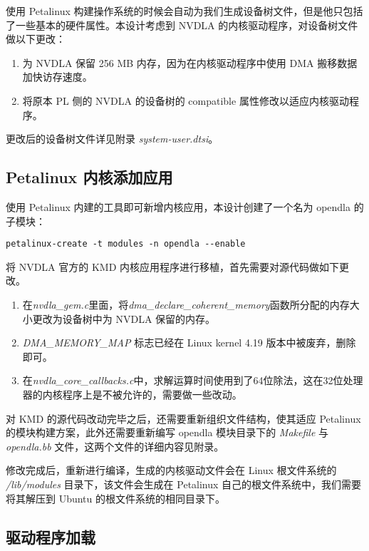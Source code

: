 使用 Petalinux 构建操作系统的时候会自动为我们生成设备树文件，但是他只包括了一些基本的硬件属性。本设计考虑到 NVDLA 的内核驱动程序，对设备树文件做以下更改：

\begin{enumerate}
    \item 为 NVDLA 保留 256 MB 内存，因为在内核驱动程序中使用 DMA 搬移数据加快访存速度。
    \item 将原本 PL 侧的 NVDLA 的设备树的 compatible 属性修改以适应内核驱动程序。
\end{enumerate}

更改后的设备树文件详见附录 \emph{system-user.dtsi}。

\subsection{Petalinux 内核添加应用}

使用 Petalinux 内建的工具即可新增内核应用，本设计创建了一个名为 opendla 的子模块：

\begin{lstlisting}
petalinux-create -t modules -n opendla --enable
\end{lstlisting}

将 NVDLA 官方的 KMD 内核应用程序进行移植，首先需要对源代码做如下更改。

\begin{enumerate}
    \item 在\emph{nvdla\_gem.c}里面，将\emph{dma\_declare\_coherent\_memory}函数所分配的内存大小更改为设备树中为 NVDLA 保留的内存。
    \item \emph{DMA\_MEMORY\_MAP } 标志已经在 Linux kernel 4.19 版本中被废弃，删除即可。
    \item 在\emph{nvdla\_core\_callbacks.c}中，求解运算时间使用到了64位除法，这在32位处理器的内核程序上是不被允许的，需要做一些改动。
\end{enumerate}

对 KMD 的源代码改动完毕之后，还需要重新组织文件结构，使其适应 Petalinux 的模块构建方案，此外还需要重新编写 opendla 模块目录下的 \emph{Makefile} 与 \emph{opendla.bb} 文件，这两个文件的详细内容见附录。

修改完成后，重新进行编译，生成的内核驱动文件会在 Linux 根文件系统的 \emph{/lib/modules} 目录下，该文件会生成在 Petalinux 自己的根文件系统中，我们需要将其解压到 Ubuntu 的根文件系统的相同目录下。

\subsection{驱动程序加载}

